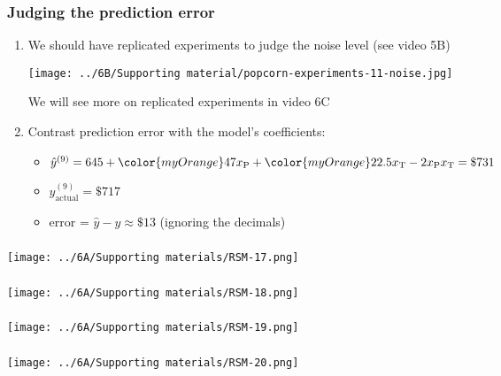 \begin{frame}\frametitle{Judging the prediction error}
	\begin{enumerate}
		\item	We should have replicated experiments to judge the noise level (see video 5B)
		
		\centerline{
			\texttt{[image: ../6B/Supporting material/popcorn-experiments-11-noise.jpg]}}
		{\small We will see more on replicated experiments in video 6C}
		
		\vspace{1cm}
		\pause
		
		\item	Contrast prediction error with the model's coefficients:
		\begin{itemize}
			\item	$\hat{y}^{(9)}  = 645 + {\color{myOrange}47} x_\text{P}+ {\color{myOrange}22.5} x_\text{T} - 2x_\text{P}x_\text{T} = \$731$
			\item	$y_\text{actual}^{(9)} = \$717$ 
			\item	error = $\hat{y} - y \approx \$ 13 $ (ignoring the decimals)
		\end{itemize}
		
	\end{enumerate}
\end{frame}

\begin{frame}\frametitle{}
	\centerline{\texttt{[image: ../6A/Supporting materials/RSM-17.png]}}
\end{frame}
\begin{frame}\frametitle{}
	\centerline{\texttt{[image: ../6A/Supporting materials/RSM-18.png]}}
\end{frame}
\begin{frame}\frametitle{}
	\centerline{\texttt{[image: ../6A/Supporting materials/RSM-19.png]}}
\end{frame}
\begin{frame}\frametitle{}
	\centerline{\texttt{[image: ../6A/Supporting materials/RSM-20.png]}}
\end{frame}


